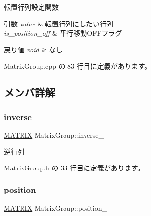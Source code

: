 転置行列設定関数 


\begin{DoxyParams}{引数}
{\em value} & 転置行列にしたい行列 \\
\hline
{\em is\+\_\+position\+\_\+off} & 平行移動\+O\+F\+Fフラグ \\
\hline
\end{DoxyParams}

\begin{DoxyRetVals}{戻り値}
{\em void} & なし \\
\hline
\end{DoxyRetVals}


 Matrix\+Group.\+cpp の 83 行目に定義があります。



\subsection{メンバ詳解}
\mbox{\label{class_matrix_group_aafc3e507a37830899c7a0775b6a30d15}} 
\subsubsection{\texorpdfstring{inverse\+\_\+}{inverse\_}}
{\footnotesize\ttfamily \mbox{\hyperlink{_matrix_8h_a032295cd9fb1b711757c90667278e744}{M\+A\+T\+R\+IX}} Matrix\+Group\+::inverse\+\_\+\hspace{0.3cm}{\ttfamily [private]}}



逆行列 



 Matrix\+Group.\+h の 33 行目に定義があります。

\mbox{\label{class_matrix_group_a15328c5929f74d11755a9ac11f5cbfb2}} 
\subsubsection{\texorpdfstring{position\+\_\+}{position\_}}
{\footnotesize\ttfamily \mbox{\hyperlink{_matrix_8h_a032295cd9fb1b711757c90667278e744}{M\+A\+T\+R\+IX}} Matrix\+Group\+::position\+\_\+\hspace{0.3cm}{\ttfamily [private]}}




